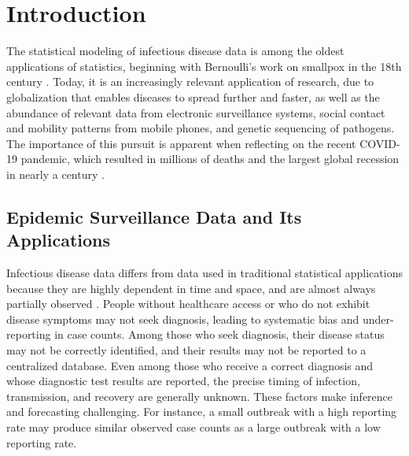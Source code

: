 \chapter{Introduction}
\label{ch:introduction}
\graphicspath{{figures/ch_1/}}

The statistical modeling of infectious disease data is among the oldest applications of statistics, beginning with Bernoulli's work on smallpox in the 18th century \citep{Bernoulli2004}.
Today, it is an increasingly relevant application of research, due to globalization that enables diseases to spread further and faster, as well as the abundance of relevant data from electronic surveillance systems, social contact and mobility patterns from mobile phones, and genetic sequencing of pathogens.
The importance of this pursuit is apparent when reflecting on the recent COVID-19 pandemic, which resulted in millions of deaths and the largest global recession in nearly a century \citep{whocoronavirus,  zumbrun_2020}.

\section{Epidemic Surveillance Data and Its Applications}
\label{ch_1:sec:epidemic_surveillance_data}

Infectious disease data differs from data used in traditional statistical applications because they are highly dependent in time and space, and are almost always partially observed \citep{held2019handbook}.
People without healthcare access or who do not exhibit disease symptoms may not seek diagnosis, leading to systematic bias and under-reporting in case counts.
Among those who seek diagnosis, their disease status may not be correctly identified, and their results may not be reported to a centralized database.
Even among those who receive a correct diagnosis and whose diagnostic test results are reported, the precise timing of infection, transmission, and recovery are generally unknown.
These factors make inference and forecasting challenging.
For instance, a small outbreak with a high reporting rate may produce similar observed case counts as a large outbreak with a low reporting rate.

